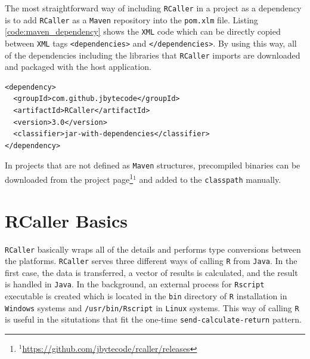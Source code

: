 \documentclass[10pt,a4paper, final, oneside]{article}
\begin{document}
The most straightforward way of including \texttt{RCaller} in a project as a dependency is to add \texttt{RCaller} as a \texttt{Maven} repository into the \texttt{pom.xlm} file. Listing \ref{code:maven_dependency} shows the \texttt{XML} code which can be directly copied between \texttt{XML} tags \texttt{<dependencies>} and \texttt{</dependencies>}. By using this way, all of the dependencies including the libraries that \texttt{RCaller} imports are downloaded and packaged with the host application.  


\begin{minipage}{\linewidth}
\begin{lstlisting}[caption=Maven dependency code, label=code:maven_dependency]
<dependency>
  <groupId>com.github.jbytecode</groupId>
  <artifactId>RCaller</artifactId>
  <version>3.0</version>
  <classifier>jar-with-dependencies</classifier>
</dependency>
\end{lstlisting}
\end{minipage}

In projects that are not defined as \texttt{Maven} structures, precompiled binaries can be downloaded from the project page\footnote{$^1$\url{https://github.com/jbytecode/rcaller/releases}}$^1$ and added to the \texttt{classpath} manually. 

\section{RCaller Basics}
\label{sec:rcaller_basics}

\texttt{RCaller} basically wraps all of the details and performs type conversions between the platforms. \texttt{RCaller} serves three different ways of calling \texttt{R} from \texttt{Java}. In the first case, the data is transferred, a vector of results is calculated, and the result is handled in \texttt{Java}. In the background, an external process for \texttt{Rscript} executable is created which is located in the \texttt{bin} directory of \texttt{R} installation in \texttt{Windows} systems and \texttt{/usr/bin/Rscript} in \texttt{Linux} systems. This way of calling \texttt{R} is useful in the situtations that fit the one-time \texttt{send-calculate-return} pattern.
\end{document}
